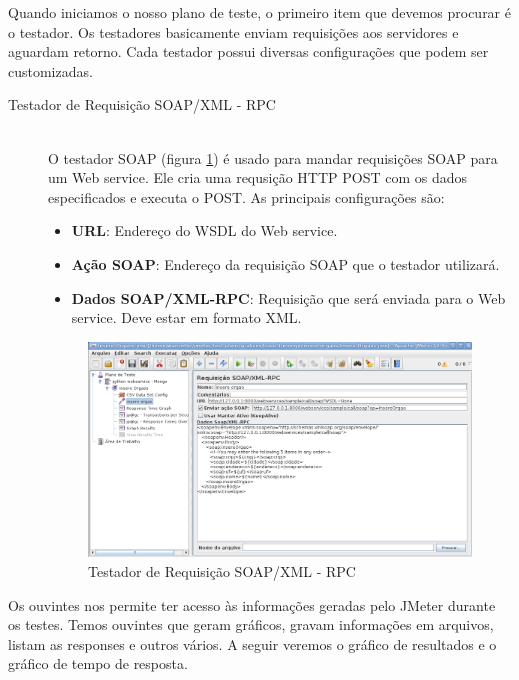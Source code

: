 Quando iniciamos o nosso plano de teste, o primeiro item que devemos procurar é o testador. Os testadores basicamente enviam requisições aos servidores e aguardam retorno. Cada testador possui diversas configurações que podem ser customizadas.

\begin{description}
\item[ Testador de Requisição SOAP/XML - RPC] \hfill \\

O testador SOAP (figura \ref{fig:testador_insere_orgao}) é usado para mandar requisições SOAP para um Web service.  Ele cria uma requsição HTTP POST com os dados especificados e executa o POST.  As principais configurações são:


\begin{itemize}
\item \textbf{URL}:  Endereço do WSDL do Web service.
\item \textbf{Ação SOAP}: Endereço da requisição SOAP que o testador utilizará.
\item \textbf{Dados SOAP/XML-RPC}: Requisição que será enviada para o Web service. Deve estar em formato XML.
\end{itemize}

	\begin{figure}[!htbp]
		\begin{center}
			\includegraphics[width=1\textwidth]{testador_insere_orgao}
		\end{center}
		\caption{Testador de Requisição SOAP/XML - RPC}
		\label{fig:testador_insere_orgao}
	\end{figure}
	
\end{description}

Os ouvintes nos permite ter acesso às informações geradas pelo JMeter durante os testes. Temos ouvintes que geram gráficos, gravam informações em arquivos, listam as responses e outros vários. A seguir veremos o gráfico de resultados e o gráfico de tempo de resposta.

